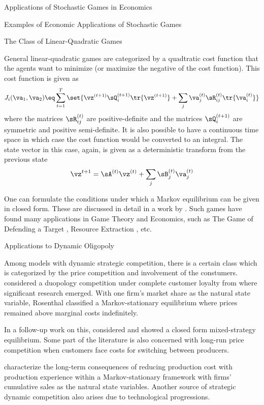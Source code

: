 \documentclass{article}
\begin{document}
\begin{psection}{Applications of Stochastic Games in Economics}
\begin{psubsection}{Examples of Economic Applications of Stochastic Games}
	\end{psubsection}

	\begin{psubsection}{The Class of Linear-Quadratic Games}

		General linear-quadratic games are categorized by a quadtratic cost function that the agents want to minimize (or maximize the negative of the cost function). This cost function is given as
		\begin{align*}
			J_i(\va_1, \va_2) \eq \sum_{t = 1}^{T} \set{\vz^{(t + 1)} \sQ^{(t + 1)}_i \tr{\vz^{(t + 1)}} + \sum_{j} \va_j^{(t)} \sR_{ij}^{(t)} \tr{\va_i^{(t)}}}
		\end{align*}
		where the matrices $\sR_{ij}^{(t)}$ are positive-definite and the matrices $\sQ_i^{(t + 1)}$ are symmetric and positive semi-definite. It is also possible to have a continuous time space in which case the cost function would be converted to an integral. The state vector in this case, again, is given as a deterministic transform from the previous state
		\begin{align*}
			\vz^{t + 1} = \sA^{(t)} \vz^{(t)} + \sum_j \sB^{(t)}_j \va_j^{(t)}
		\end{align*}

		One can formulate the conditions under which a Markov equilibrium can be given in closed form. These are discussed in detail in a work by \cite{lin-quad}. Such games have found many applications in Game Theory and Economics, such as The Game of Defending a Target \citep{game-defend}, Resource Extraction \citep{lin-quad-re}, etc.

	\end{psubsection}

	\begin{psubsection}{Applications to Dynamic Oligopoly}

		Among models with dynamic strategic competition, there is a certain class which is categorized by the price competition and involvement of the constumers. \cite{rosenthal} considered a duopology competition under complete customer loyalty from where significant research emerged. With one firm's market share as the natural state variable, Rosenthal classified a Markov-stationary equilibrium where prices remained above marginal costs indefinitely.

		In a follow-up work on this, \cite{chen-rosenthal} considered and showed a closed form mixed-strategy equilibrium. Some part of the literature is also concerned with long-run price competition when customers face costs for switching between producers.

		\cite{cabral-riordan} characterize the long-term consequences of reducing production cost with production experience within a  Markov-stationary framework with firms' cumulative sales as the natural state variables. Another source of strategic dynamic competition also arises due to technological progressions.

	\end{psubsection}

\end{psection}



\end{document}

